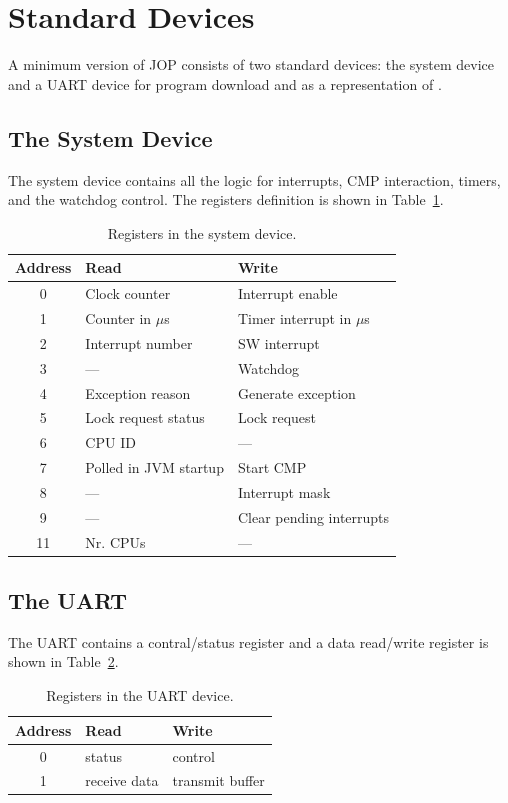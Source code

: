 \section{Standard Devices}

A minimum version of JOP consists of two standard devices: the system
device and a UART device for program download and as a representation
of .

\subsection{The System Device}


The system device contains all the logic for interrupts, CMP
interaction, timers, and the watchdog control. The registers
definition is shown in Table~\ref{tab:io:sysdev}.

\begin{table}[t]
    \centering
    \begin{tabular}{cll}
        \toprule
        Address  & Read & Write \\
        \midrule
        0 & Clock counter & Interrupt enable \\
        1 & Counter in $\mu$s & Timer interrupt in $\mu$s \\
        2 & Interrupt number & SW interrupt \\
        3 & --- & Watchdog \\
        4 & Exception reason & Generate exception \\
        5 & Lock request status & Lock request \\
        6 & CPU ID & --- \\
        7 & Polled in JVM startup & Start CMP \\
        8 & --- & Interrupt mask \\
        9 & --- & Clear pending interrupts \\
        11 & Nr. CPUs & --- \\
        \bottomrule
    \end{tabular}
    \caption{Registers in the system device.}
    \label{tab:io:sysdev}
\end{table}

\subsection{The UART}

The UART contains a contral/status register and a data read/write
register is shown in Table~\ref{tab:io:uart}.

\begin{table}[t]
    \centering
    \begin{tabular}{cll}
        \toprule
        Address  & Read & Write \\
        \midrule
        0 & status & control \\
        1 & receive data & transmit buffer \\
        \bottomrule
    \end{tabular}
    \caption{Registers in the UART device.}
    \label{tab:io:uart}
\end{table}
